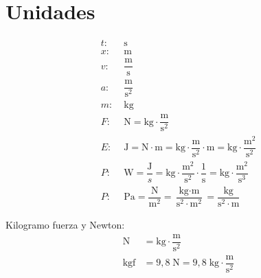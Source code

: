 \section{Unidades}

\vspace{-\baselineskip}
\begin{align*}
t:\;& \text{s}\\
x:\;& \text{m}\\
v:\;& \dfrac{\text{m}}{\text{s}}\\
a:\;& \dfrac{\text{m}}{\text{s}^2}\\
m:\;& \text{kg}\\
F:\;&  \text{N} = \text{kg}\cdot \dfrac{\text{m}}{\text{s}^2}\\
E:\;&  \text{J} =
\text{N}\cdot\text{m} =
\text{kg}\cdot \dfrac{\text{m}}{\text{s}^2} \cdot \text{m} =
\text{kg}\cdot \dfrac{\text{m}^2}{\text{s}^2}\\
P:\;& \text{W} =
\dfrac{\text{J}}{s} =
\text{kg}\cdot \dfrac{\text{m}^2}{\text{s}^2} \cdot \dfrac{1}{\text{s}} =
\text{kg}\cdot \dfrac{\text{m}^2}{\text{s}^3}\\
P:\;&\text{Pa} =
\dfrac{\text{N}}{\text{m}^2} =
\dfrac{\text{kg}\cdot \text{m}}{\text{s}^2 \cdot \text{m}^2} =
\dfrac{\text{kg}}{\text{s}^2 \cdot \text{m}}
\end{align*}

Kilogramo fuerza y Newton:
\begin{align*}
    \text{N} &= \text{kg} \cdot \dfrac{\text{m}}{\text{s}^2}\\
    \text{kgf} &= 9,8 \;\text{N} = 9,8\;\text{kg} \cdot \dfrac{\text{m}}{\text{s}^2} \\
\end{align*}


